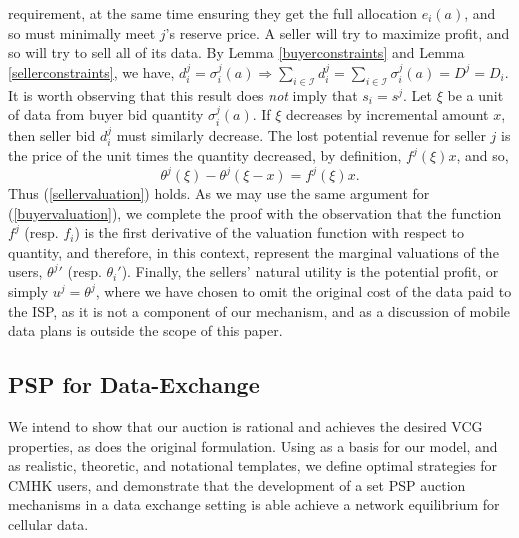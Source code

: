 \documentclass[12pt]{article}
\theoremstyle{definition}
\newcommand{\mcI}{\mathcal{I}}
\newcommand{\g}{\sigma}
\begin{document}
\begin{multicols}{2}
requirement, at the same time ensuring they get the full allocation $e_i(a)$,
and so must minimally meet $j$'s reserve price. 
A seller will try to maximize profit, 
and so will try to sell all of its data.  By Lemma
\ref{buyerconstraints} and Lemma \ref{sellerconstraints}, we have,
$d_i^j = \g_i^j(a) \Rightarrow \sum_{i\in{\mcI}} d_i^j =
\sum_{i\in\mcI} \g_i^j(a) = D^j = D_i$. It is worth observing that this result
does \emph{not} imply that $s_i=s^j$. Let $\xi$
be a unit of data from buyer bid quantity $\g_i^j(a)$.
If $\xi$ decreases by incremental amount $x$, then seller bid $d_i^j$ must
similarly decrease. The lost potential revenue for seller $j$ is the price of
the unit times the quantity decreased, by definition, $f^j(\xi)x$, and so,
$$
    \theta^j(\xi) - \theta^j(\xi-x) = f^j(\xi)x.
$$
Thus (\ref{sellervaluation}) holds.
As we may use the same argument for (\ref{buyervaluation}), we complete the
proof with the observation that the function $f^j$ (resp. $f_i$) is the first
derivative of the valuation function with respect to
quantity, and therefore, in this context, represent the marginal valuations of the
users, ${\theta^j}'$ (resp. $\theta_i'$). Finally, the sellers' natural utility is the potential
profit, or simply $u^j = \theta^j$, where we have chosen to omit the original cost of the data
paid to the ISP, as it is not a component of our mechanism, and as a discussion
of mobile data plans is outside the scope of this paper.  

\subsection{PSP for Data-Exchange}

We intend to show that our auction
is rational and achieves the desired VCG properties, as does the original
formulation. Using \cite{zheng} as a basis for our model, and \cite{lazar} as
realistic, theoretic, and notational templates, we define optimal strategies for
CMHK users, and demonstrate that the development of a set PSP auction mechanisms
in a data exchange setting is able achieve a network equilibrium for cellular data. 



\end{multicols}
\end{document}
